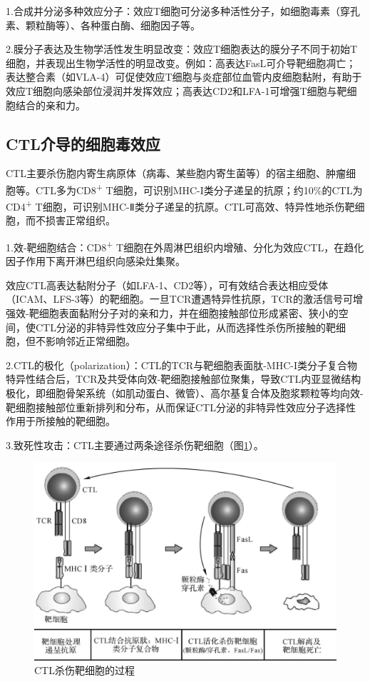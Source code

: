 1.合成并分泌多种效应分子：效应T细胞可分泌多种活性分子，如细胞毒素（穿孔素、颗粒酶等）、各种蛋白酶、细胞因子等。

2.膜分子表达及生物学活性发生明显改变：效应T细胞表达的膜分子不同于初始T细胞，并表现出生物学活性的明显改变。例如：高表达FasL可介导靶细胞凋亡；表达整合素（如VLA-4）可促使效应T细胞与炎症部位血管内皮细胞黏附，有助于效应T细胞向感染部位浸润并发挥效应；高表达CD2和LFA-1可增强T细胞与靶细胞结合的亲和力。


\subsection{CTL介导的细胞毒效应}

CTL主要杀伤胞内寄生病原体（病毒、某些胞内寄生菌等）的宿主细胞、肿瘤细胞等。CTL多为CD8\textsuperscript{+}
T细胞，可识别MHC-I类分子递呈的抗原；约10\%的CTL为CD4\textsuperscript{+}
T细胞，可识别MHC-Ⅱ类分子递呈的抗原。CTL可高效、特异性地杀伤靶细胞，而不损害正常组织。

1.效-靶细胞结合：CD8\textsuperscript{+}
T细胞在外周淋巴组织内增殖、分化为效应CTL，在趋化因子作用下离开淋巴组织向感染灶集聚。

效应CTL高表达黏附分子（如LFA-1、CD2等），可有效结合表达相应受体（ICAM、LFS-3等）的靶细胞。一旦TCR遭遇特异性抗原，TCR的激活信号可增强效-靶细胞表面黏附分子对的亲和力，并在细胞接触部位形成紧密、狭小的空间，使CTL分泌的非特异性效应分子集中于此，从而选择性杀伤所接触的靶细胞，但不影响邻近正常细胞。

2.CTL的极化（polarization）：CTL的TCR与靶细胞表面肽-MHC-I类分子复合物特异性结合后，TCR及共受体向效-靶细胞接触部位聚集，导致CTL内亚显微结构极化，即细胞骨架系统（如肌动蛋白、微管）、高尔基复合体及胞浆颗粒等均向效-靶细胞接触部位重新排列和分布，从而保证CTL分泌的非特异性效应分子选择性作用于所接触的靶细胞。

3.致死性攻击：CTL主要通过两条途径杀伤靶细胞（图\ref{fig9-23}）。

\begin{figure}[!htbp]
 \centering
 \includegraphics[width=.6\textwidth]{./images/Image00149.jpg}
 \captionsetup{justification=centering}
 \caption{CTL杀伤靶细胞的过程}
 \label{fig9-23}
  \end{figure} 


